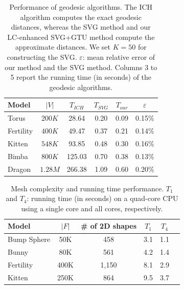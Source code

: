   \begin{table}[htbp]
  \centering
  \caption{Performance of geodesic algorithms.
  The ICH algorithm computes the exact geodesic distances, whereas the SVG method and our LC-enhanced SVG+GTU method compute the approximate distances.
  We set $K=50$ for constructing the SVG.
  $\varepsilon$: mean relative error of our method and the SVG method.
  Columns 3 to 5 report the running time (in seconds) of the geodesic algorithms.
  }
  \begin{tabular}{ | l | c | c | c | c | c | }					
  \hline
  Model & $|V|$ 	& $T_{ICH}$  & $T_{SVG}$	& $T_{our}$ 	& $\varepsilon$ 	 \\ \hline		
  \hline
  Torus & $200K$  						& 28.64    & 0.20  	& 0.09  			& 0.15\%			 \\ \hline	
  Fertility & $400K$ 					& 49.47    & 0.37  	& 0.21  			& 0.14\%			 \\ \hline	
  Kitten & $548K$						& 93.85    & 0.48  	& 0.30  			& 0.16\% 			 \\ \hline	
  Bimba & $800K$ 						& 125.03   & 0.70  	& 0.38  			& 0.13\% 			 \\ \hline	
  Dragon & $1.28M$ 						& 266.38   & 1.09  	& 0.60  			& 0.20\% 			 \\ \hline					 
  \end{tabular}%
  \label{table:timeperformance}
  \end{table}

  \begin{table}[htbp]
  \centering
  \caption{Mesh complexity and running time performance.
  $T_1$ and $T_4$: running time (in seconds) on a quad-core CPU using a single core and all cores, respectively.}
  \begin{tabular}{ | l | c| c | c | c |  c | }					
		\hline
		Model  & $|F|$ & \# of 2D shapes & $T_1$ & $T_4$ \\ \hline		
		Bump Sphere & 50K  						& 458    & 3.1  	& 1.1  			 			 \\ \hline	
		Bunny  & 80K	 					&  561   & 4.2  	& 1.4  					 \\ \hline	
		Fertility & 400K 				& 1,150    & 8.1  	& 2.9  			 			 \\ \hline	
		Kitten & 250K 						& 864   & 9.5  	& 3.7  			 			 \\ \hline	
  \end{tabular}%
  \label{table:shape_distribution_time}
  \end{table}


